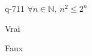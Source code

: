 \begin{truefalse}{q-711}
$\forall n \in \mathbb N,\: n^2\leq 2^n$
\item Vrai
\item* Faux
\end{truefalse}

